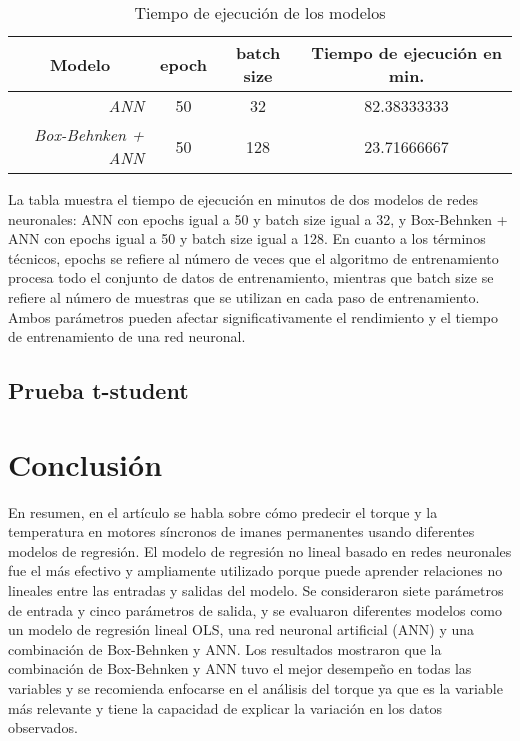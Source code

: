 \documentclass{article}
\begin{document}
\begin{table}[ht]
\begin{tabular}{|r|c|c|c|}
\hline
\multicolumn{1}{|c|}{Modelo} & epoch & batch size & Tiempo de ejecución en min. \\ \hline
\textit{ANN} & 50 & 32 & 82.38333333 \\ \hline
\textit{Box-Behnken + ANN} & 50 & 128 &  23.71666667\\ \hline
\end{tabular}
\caption{Tiempo de ejecución de los modelos}
\label{tab:tiempo-ejecucion}
\end{table}

La tabla muestra el tiempo de ejecución en minutos de dos modelos de redes neuronales: ANN con epochs igual a 50 y batch size igual a 32, y Box-Behnken + ANN con epochs igual a 50 y batch size igual a 128. En cuanto a los términos técnicos, epochs se refiere al número de veces que el algoritmo de entrenamiento procesa todo el conjunto de datos de entrenamiento, mientras que batch size se refiere al número de muestras que se utilizan en cada paso de entrenamiento. Ambos parámetros pueden afectar significativamente el rendimiento y el tiempo de entrenamiento de una red neuronal.

\subsection{Prueba t-student}


\section{Conclusión}
En resumen, en el artículo se habla sobre cómo predecir el torque y la temperatura en motores síncronos de imanes permanentes usando diferentes modelos de regresión. El modelo de regresión no lineal basado en redes neuronales fue el más efectivo y ampliamente utilizado porque puede aprender relaciones no lineales entre las entradas y salidas del modelo. Se consideraron siete parámetros de entrada y cinco parámetros de salida, y se evaluaron diferentes modelos como un modelo de regresión lineal OLS, una red neuronal artificial (ANN) y una combinación de Box-Behnken y ANN. Los resultados mostraron que la combinación de Box-Behnken y ANN tuvo el mejor desempeño en todas las variables y se recomienda enfocarse en el análisis del torque ya que es la variable más relevante y tiene la capacidad de explicar la variación en los datos observados.

\pagebreak


\end{document}
